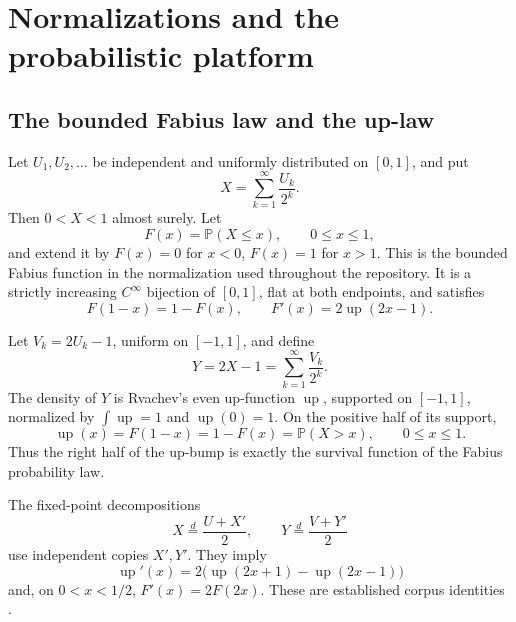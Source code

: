 \documentclass[11pt,oneside]{article}
\numberwithin{equation}{section}
\theoremstyle{definition}
\theoremstyle{remark}
\newcommand{\Up}{\operatorname{up}}
\newcommand{\Prob}{\mathbb P}
\begin{document}
\section{Normalizations and the probabilistic platform}
\label{sec:platform}

\subsection{The bounded Fabius law and the up-law}

Let \(U_1,U_2,\ldots\) be independent and uniformly distributed on \([0,1]\), and
put
\begin{equation}
 X=\sum_{k=1}^{\infty}\frac{U_k}{2^k}.
 \label{eq:Xdef}
\end{equation}
Then \(0<X<1\) almost surely.  Let
\begin{equation}
 F(x)=\Prob(X\le x),\qquad 0\le x\le1,
 \label{eq:Fcdf}
\end{equation}
and extend it by \(F(x)=0\) for \(x<0\), \(F(x)=1\) for \(x>1\).
This is the bounded Fabius function in the normalization used throughout the
repository.  It is a strictly increasing \(C^\infty\) bijection of \([0,1]\),
flat at both endpoints, and satisfies
\begin{equation}
 F(1-x)=1-F(x),
 \qquad
 F'(x)=2\Up(2x-1).
 \label{eq:Fuprelations}
\end{equation}

Let \(V_k=2U_k-1\), uniform on \([-1,1]\), and define
\begin{equation}
 Y=2X-1=\sum_{k=1}^{\infty}\frac{V_k}{2^k}.
 \label{eq:Ydef}
\end{equation}
The density of \(Y\) is Rvachev's even up-function \(\Up\), supported on
\([-1,1]\), normalized by \(\int\Up=1\) and \(\Up(0)=1\).  On the positive half
of its support,
\begin{equation}
 \boxed{\Up(x)=F(1-x)=1-F(x)=\Prob(X>x),\qquad 0\le x\le1.}
 \label{eq:up-survival}
\end{equation}
Thus the right half of the up-bump is exactly the survival function of the
Fabius probability law.

The fixed-point decompositions
\begin{equation}
 X\stackrel d=\frac{U+X'}2,
 \qquad
 Y\stackrel d=\frac{V+Y'}2
 \label{eq:fixedpoints}
\end{equation}
use independent copies \(X',Y'\).  They imply
\begin{equation}
 \Up'(x)=2\bigl(\Up(2x+1)-\Up(2x-1)\bigr)
 \label{eq:up-refinement}
\end{equation}
and, on \(0<x<1/2\), \(F'(x)=2F(2x)\).  These are established corpus
identities \cite{proveitPrimary,arias1982}.
\end{document}
